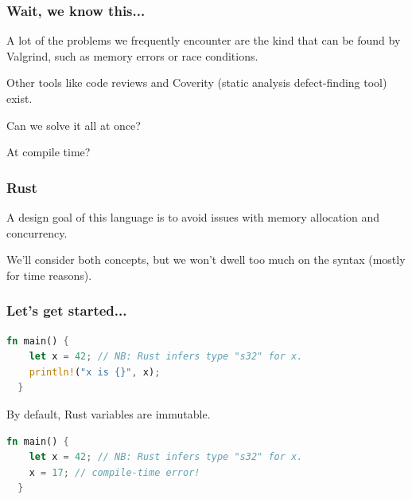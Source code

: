 \begin{frame}
\frametitle{Wait, we know this...}

A lot of the problems we frequently encounter are the kind that can be found by Valgrind, such as memory errors or race conditions.

Other tools like code reviews and Coverity (static analysis defect-finding tool) exist.

Can we solve it all at once?

At compile time?

\end{frame}



\begin{frame}
\frametitle{Rust}

A design goal of this language is to avoid issues with memory allocation and concurrency. 

We'll consider both concepts, but we won't dwell too much on the syntax (mostly for time reasons).


\end{frame}



\begin{frame}[fragile]
\frametitle{Let's get started...}

\begin{lstlisting}[language=Rust]
  fn main() {
    let x = 42; // NB: Rust infers type "s32" for x.
    println!("x is {}", x);
  }
\end{lstlisting}
By default, Rust variables are \alert{immutable}.
\vspace*{-.5em}
\begin{lstlisting}[language=Rust]
  fn main() {
    let x = 42; // NB: Rust infers type "s32" for x.
    x = 17; // compile-time error!
  }
\end{lstlisting}

\end{frame}

